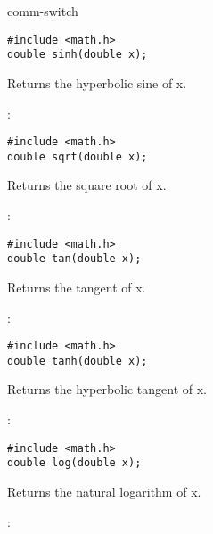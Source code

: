 \begin{Ventry2}{comm-switch  }
\begin{production}
\begin{verbatim}
#include <math.h>
double sinh(double x);
\end{verbatim}
\end{production}


Returns the hyperbolic sine of x.

\item[sqrt]
\label{item:sqrt}
:

\begin{production}
\begin{verbatim}
#include <math.h>
double sqrt(double x);
\end{verbatim}
\end{production}


Returns the square root of x.

\item[tan]
\label{item:tan}
:

\begin{production}
\begin{verbatim}
#include <math.h>
double tan(double x);
\end{verbatim}
\end{production}


Returns the tangent of x.

\item[tanh]
\label{item:tanh}
:

\begin{production}
\begin{verbatim}
#include <math.h>
double tanh(double x);
\end{verbatim}
\end{production}


Returns the hyperbolic tangent of x.

\item[log]
\label{item:log}
:

\begin{production}
\begin{verbatim}
#include <math.h>
double log(double x);
\end{verbatim}
\end{production}


Returns the natural logarithm of x.

\item[log10]
\label{item:log10}
:


\end{Ventry2}
